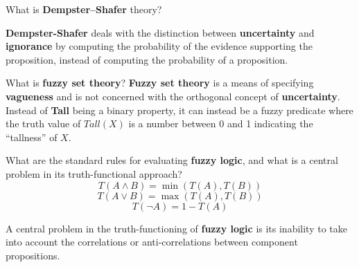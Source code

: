 \begin{flashcard}[Question]{What is \textbf{Dempster--Shafer} theory?}
\begin{center}
\textbf{Dempster-Shafer} deals with the distinction between \textbf{uncertainty} and \textbf{ignorance} by computing the probability of the evidence supporting the proposition, instead of computing the probability of a proposition.
\end{center}
\end{flashcard}

\begin{flashcard}[Question]{What is \textbf{fuzzy set theory}?}
\textbf{Fuzzy set theory} is a means of specifying \textbf{vagueness} and is not concerned with the orthogonal concept of \textbf{uncertainty}. Instead of \textbf{Tall} being a binary property, it can instead be a fuzzy predicate where the truth value of $\textit{Tall}(X)$ is a number between 0 and 1 indicating the ``tallness'' of $X$.
\end{flashcard}

\begin{flashcard}[Question]{What are the standard rules for evaluating \textbf{fuzzy logic}, and what is a central problem in its truth-functional approach?}
\begin{displaymath}
T(A \land B) = \min(T(A), T(B))
\end{displaymath}
\begin{displaymath}
T(A \lor  B) = \max(T(A), T(B))
\end{displaymath}
\begin{displaymath}
T(\neg A) = 1 - T(A)
\end{displaymath}
\begin{center}

\medskip

A central problem in the truth-functioning of \textbf{fuzzy logic} is its inability to take into account the correlations or anti-correlations between component propositions.
\end{center}
\end{flashcard}
